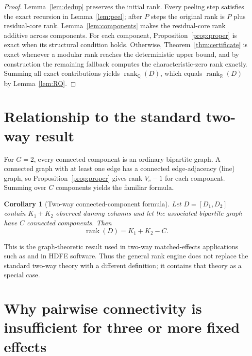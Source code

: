 \documentclass[11pt]{article}
\newtheorem{corollary}[theorem]{Corollary}
\theoremstyle{definition}
\newcommand{\R}{\mathbb{R}}
\newcommand{\Q}{\mathbb{Q}}
\newcommand{\rank}{\operatorname{rank}}
\newcommand{\1}{\mathbf{1}}
\begin{document}
\begin{proof}
Lemma~\ref{lem:dedup} preserves the initial rank. Every peeling step satisfies the exact recursion in Lemma~\ref{lem:peel}; after $P$ steps the original rank is $P$ plus residual-core rank. Lemma~\ref{lem:components} makes the residual-core rank additive across components. For each component, Proposition~\ref{prop:proper} is exact when its structural condition holds. Otherwise, Theorem~\ref{thm:certificate} is exact whenever a modular rank reaches the deterministic upper bound, and by construction the remaining fallback computes the characteristic-zero rank exactly. Summing all exact contributions yields $\rank_{\Q}(D)$, which equals $\rank_{\R}(D)$ by Lemma~\ref{lem:RQ}.
\end{proof}

\section{Relationship to the standard two-way result}

For $G=2$, every connected component is an ordinary bipartite graph. A connected graph with at least one edge has a connected edge-adjacency (line) graph, so Proposition~\ref{prop:proper} gives rank $V_c-1$ for each component. Summing over $C$ components yields the familiar formula.

\begin{corollary}[Two-way connected-component formula]\label{cor:twoway}
Let $D=[D_1,D_2]$ contain $K_1+K_2$ observed dummy columns and let the associated bipartite graph have $C$ connected components. Then
\begin{equation}
  \rank(D)=K_1+K_2-C.
  \label{eq:twoway}
\end{equation}
\end{corollary}

This is the graph-theoretic result used in two-way matched-effects applications such as \citet{AbowdCreecyKramarz2002} and in HDFE software. Thus the general rank engine does not replace the standard two-way theory with a different definition; it contains that theory as a special case.

\section{Why pairwise connectivity is insufficient for three or more fixed effects}
\end{document}
